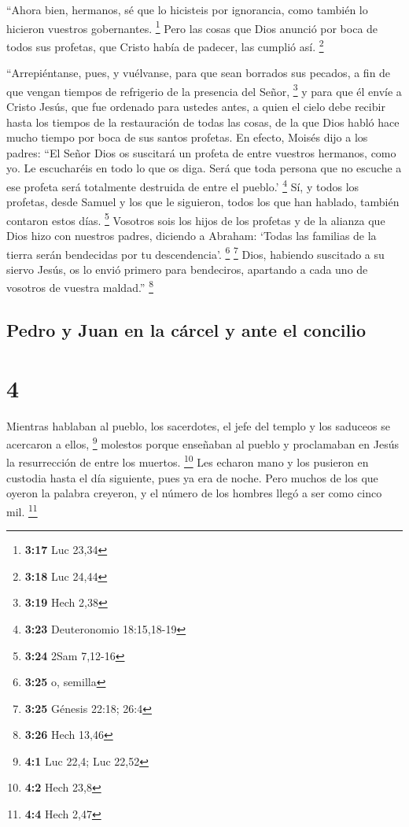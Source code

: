  ``Ahora bien, hermanos, sé que lo hicisteis por
ignorancia, como también lo hicieron vuestros gobernantes. \footnote{\textbf{3:17}
  Luc 23,34}  Pero las cosas que Dios anunció por boca de
todos sus profetas, que Cristo había de padecer, las cumplió así.
\footnote{\textbf{3:18} Luc 24,44}

 ``Arrepiéntanse, pues, y vuélvanse, para que sean
borrados sus pecados, a fin de que vengan tiempos de refrigerio de la
presencia del Señor, \footnote{\textbf{3:19} Hech 2,38} 
y para que él envíe a Cristo Jesús, que fue ordenado para ustedes antes,
 a quien el cielo debe recibir hasta los tiempos de la
restauración de todas las cosas, de la que Dios habló hace mucho tiempo
por boca de sus santos profetas.  En efecto, Moisés dijo
a los padres: ``El Señor Dios os suscitará un profeta de entre vuestros
hermanos, como yo. Le escucharéis en todo lo que os diga.
 Será que toda persona que no escuche a ese profeta será
totalmente destruida de entre el pueblo.' \footnote{\textbf{3:23}
  Deuteronomio 18:15,18-19}  Sí, y todos los profetas,
desde Samuel y los que le siguieron, todos los que han hablado, también
contaron estos días. \footnote{\textbf{3:24} 2Sam 7,12-16}
 Vosotros sois los hijos de los profetas y de la alianza
que Dios hizo con nuestros padres, diciendo a Abraham: `Todas las
familias de la tierra serán bendecidas por tu descendencia'. \footnote{\textbf{3:25}
  o, semilla} \footnote{\textbf{3:25} Génesis 22:18; 26:4}
 Dios, habiendo suscitado a su siervo Jesús, os lo envió
primero para bendeciros, apartando a cada uno de vosotros de vuestra
maldad.'' \footnote{\textbf{3:26} Hech 13,46}

\hypertarget{pedro-y-juan-en-la-cuxe1rcel-y-ante-el-concilio}{%
\subsection{Pedro y Juan en la cárcel y ante el
concilio}\label{pedro-y-juan-en-la-cuxe1rcel-y-ante-el-concilio}}

\hypertarget{section-3}{%
\section{4}\label{section-3}}

 Mientras hablaban al pueblo, los sacerdotes, el jefe del
templo y los saduceos se acercaron a ellos, \footnote{\textbf{4:1} Luc
  22,4; Luc 22,52}  molestos porque enseñaban al pueblo y
proclamaban en Jesús la resurrección de entre los muertos. \footnote{\textbf{4:2}
  Hech 23,8}  Les echaron mano y los pusieron en custodia
hasta el día siguiente, pues ya era de noche.  Pero muchos
de los que oyeron la palabra creyeron, y el número de los hombres llegó
a ser como cinco mil. \footnote{\textbf{4:4} Hech 2,47}

